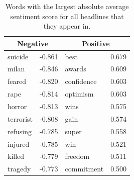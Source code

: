 \documentclass[a4paper,12pt]{article}
\begin{document}
\begin{table}[H]
    \centering
    \caption{Words with the largest absolute average sentiment score for all headlines that they appear in.}
    \begin{tabular}{lc|lc}
        \hline
        \multicolumn{2}{c}{\textbf{Negative}} & \multicolumn{2}{c}{\textbf{Positive}} \\
        \hline
        suicide & -0.861 & best & 0.679 \\
        milan & -0.846 & awards & 0.609 \\
        feared & -0.820 & confidence & 0.603 \\
        rape & -0.814 & optimism & 0.603 \\
        horror & -0.813 & wins & 0.575 \\
        terrorist & -0.808 & gain & 0.574 \\
        refusing & -0.785 & super & 0.558 \\
        injured & -0.785 & win & 0.521 \\
        killed & -0.779 & freedom & 0.511 \\
        tragedy & -0.773 & commitment & 0.500 \\
        \hline
    \end{tabular}
    \label{tab:word_stigma}
\end{table}

\printbibliography
\end{document}
